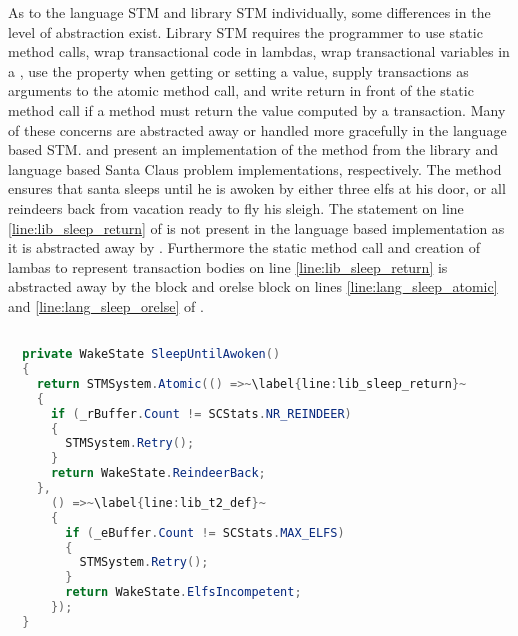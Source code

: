 As to the language \ac{STM} and library \ac{STM} individually, some differences in the level of abstraction exist. Library \ac{STM} requires the programmer to use static method calls, wrap transactional code in lambdas, wrap transactional variables in a , use the  property when getting or setting a value, supply  transactions as arguments to the atomic method call, and write return in front of the static method call if a method must return the value computed by a transaction. Many of these concerns are abstracted away or handled more gracefully in the language based \ac{STM}.  and  present an implementation of the  method from the library and language based Santa Claus problem implementations, respectively. The method ensures that santa sleeps until he is awoken by either three elfs at his door, or all reindeers back from vacation ready to fly his sleigh. The  statement on line \ref{line:lib_sleep_return} of  is not present in the language based implementation as it is abstracted away by \stmnamesp. Furthermore the static method call and creation of lambas to represent transaction bodies on line \ref{line:lib_sleep_return} is abstracted away by the  block and orelse block on lines \ref{line:lang_sleep_atomic} and \ref{line:lang_sleep_orelse} of .

\begin{lstlisting}[label=lst:lib_SleepUntilAwoken,
  caption={\bscode{SleepUntilAwoken} Method - \ac{STM} Library},
  language=Java,  
  showspaces=false,
  showtabs=false,
  breaklines=true,
  showstringspaces=false,
  breakatwhitespace=true,
  escapechar=~,
  commentstyle=\color{greencomments},
  keywordstyle=\color{bluekeywords},
  stringstyle=\color{redstrings},
  morekeywords={atomic, retry, orelse, var, get, set, ref, out}]  % Start your code-block

  private WakeState SleepUntilAwoken()
  {
    return STMSystem.Atomic(() =>~\label{line:lib_sleep_return}~
    {
      if (_rBuffer.Count != SCStats.NR_REINDEER)
      {
        STMSystem.Retry();
      }
      return WakeState.ReindeerBack;
    },
      () =>~\label{line:lib_t2_def}~
      {
        if (_eBuffer.Count != SCStats.MAX_ELFS)
        {
          STMSystem.Retry();
        }
        return WakeState.ElfsIncompetent;
      });
  }
\end{lstlisting}

